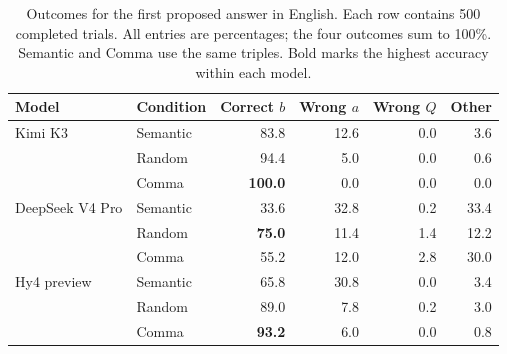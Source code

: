 \begin{table}[!t]
\centering
\small
\setlength{\tabcolsep}{7pt}
\renewcommand{\arraystretch}{1.12}
\caption{Outcomes for the first proposed answer in English. Each row contains 500 completed
trials. All entries are percentages; the four outcomes sum to 100\%.
Semantic and Comma use the same triples. Bold marks the highest accuracy
within each model.}
\label{tab:strict-results-en}
\begin{tabular}{@{}llrrrr@{}}
\toprule
Model & Condition & Correct $b$ & Wrong $a$ & Wrong $Q$ & Other \\
\midrule
Kimi K3 & Semantic & 83.8 & 12.6 & 0.0 & 3.6 \\
 & Random & 94.4 & 5.0 & 0.0 & 0.6 \\
 & Comma & \textbf{100.0} & 0.0 & 0.0 & 0.0 \\
\midrule
DeepSeek V4 Pro & Semantic & 33.6 & 32.8 & 0.2 & 33.4 \\
 & Random & \textbf{75.0} & 11.4 & 1.4 & 12.2 \\
 & Comma & 55.2 & 12.0 & 2.8 & 30.0 \\
\midrule
Hy4 preview & Semantic & 65.8 & 30.8 & 0.0 & 3.4 \\
 & Random & 89.0 & 7.8 & 0.2 & 3.0 \\
 & Comma & \textbf{93.2} & 6.0 & 0.0 & 0.8 \\
\bottomrule
\end{tabular}
\end{table}
